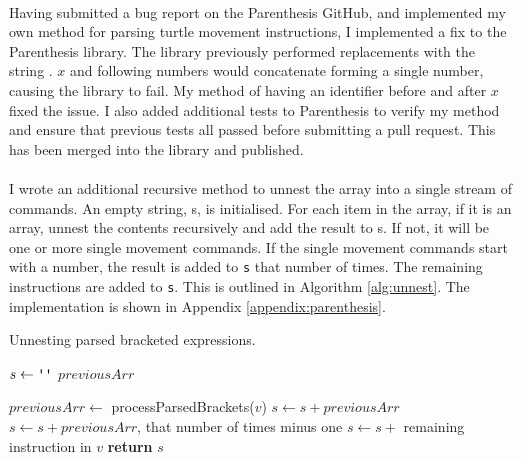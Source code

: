\paragraph{} Having submitted a bug report on the Parenthesis GitHub, and implemented my own method for parsing turtle movement instructions, I implemented a fix to the Parenthesis library. The library previously performed replacements with the string . $x$ and following numbers would concatenate forming a single number, causing the library to fail. My method of having an identifier before and after $x$ fixed the issue. I also added additional tests to Parenthesis to verify my method and ensure that previous tests all passed before submitting a pull request. This has been merged into the library and published.

\paragraph{} I wrote an additional recursive method to unnest the array into a single stream of commands. An empty string, s, is initialised. For each item in the array, if it is an array, unnest the contents recursively and add the result to s. If not, it will be one or more single movement commands. If the single movement commands start with a number, the result is added to \texttt{s} that number of times. The remaining instructions are added to \texttt{s}. This is outlined in Algorithm \ref{alg:unnest}. The implementation is shown in Appendix \ref{appendix:parenthesis}.

\begin{algorithm}[!htbp]
\caption{Unnesting parsed bracketed expressions.}
\label{alg:unnest}
\begin{algorithmic}[1]

   \State $s\gets \texttt{\upquote{}}$
   \State $previousArr$

     \State $previousArr \gets$ processParsedBrackets($v$)
    \Else
        \State $s \gets s + previousArr$
          \State $s \gets s + previousArr$, that number of times minus one
        \EndIf
       \EndIf
       \State $s \gets s + $ remaining instruction in $v$
    \EndIf
   \EndFor
   \State \textbf{return} $s$

\EndProcedure
\end{algorithmic}
\end{algorithm}

